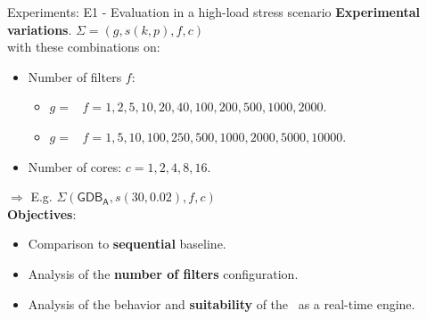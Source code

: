 \begin{frame}{Experiments: E1 - Evaluation in a high-load stress scenario}
\textbf{Experimental variations}. $\Sigma= (g, s(k, p), f, c)$\\
with these combinations on:
\vspace{0.3em}
\begin{itemize}
    \item Number of filters $f$:
    \begin{itemize}
        \item $g = $ \smallG\ $f=1,2,5,10,20,40,100,200,500,1000,2000$.
        \item $g = $ \mediumG\ $f=1,5,10,100,250,500,1000,2000,5000,10000$.
    \end{itemize} 
    \item Number of cores: $c = 1, 2, 4, 8, 16$.
\end{itemize}
\vspace{0.7em}
$\Rightarrow$ {\small E.g. $\Sigma(\mathsf{GDB_A}, s(30, 0.02), f, c)$\\}
\vspace{0.5em}
\textbf{Objectives}:
\begin{itemize}
    \item Comparison to \textbf{sequential} baseline.
    \item Analysis of the \textbf{number of filters} configuration.
    \item Analysis of the behavior and \textbf{suitability} of the \DPATM\ as a real-time engine.
\end{itemize}
\end{frame}

